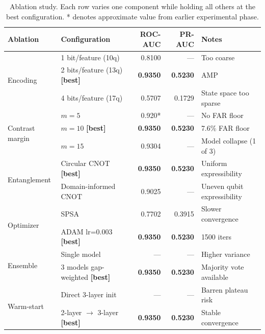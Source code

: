 \begin{table}[htbp]
\centering
\caption{Ablation study. Each row varies one component while holding all others at the best configuration. * denotes approximate value from earlier experimental phase.}
\label{tab:ablation}
\begin{tabular}{llrrp{4cm}}
\toprule
\textbf{Ablation} & \textbf{Configuration} & \textbf{ROC-AUC} & \textbf{PR-AUC} & \textbf{Notes} \\
\midrule
\multirow{3}{*}{Encoding} & 1 bit/feature (10q) & 0.8100 & — & Too coarse \\
 & 2 bits/feature (13q) \textbf{[best]} & \textbf{0.9350} & \textbf{0.5230} & AMP \\
 & 4 bits/feature (17q) & 0.5707 & 0.1729 & State space too sparse \\
\midrule
\multirow{3}{*}{Contrast margin} & $m=5$ & 0.920* & — & No FAR floor \\
 & $m=10$ \textbf{[best]} & \textbf{0.9350} & \textbf{0.5230} & 7.6\% FAR floor \\
 & $m=15$ & 0.9304 & — & Model collapse (1 of 3) \\
\midrule
\multirow{2}{*}{Entanglement} & Circular CNOT \textbf{[best]} & \textbf{0.9350} & \textbf{0.5230} & Uniform expressibility \\
 & Domain-informed CNOT & 0.9025 & — & Uneven qubit expressibility \\
\midrule
\multirow{2}{*}{Optimizer} & SPSA & 0.7702 & 0.3915 & Slower convergence \\
 & ADAM lr=0.003 \textbf{[best]} & \textbf{0.9350} & \textbf{0.5230} & 1500 iters \\
\midrule
\multirow{2}{*}{Ensemble} & Single model & — & — & Higher variance \\
 & 3 models gap-weighted \textbf{[best]} & \textbf{0.9350} & \textbf{0.5230} & Majority vote available \\
\midrule
\multirow{2}{*}{Warm-start} & Direct 3-layer init & — & — & Barren plateau risk \\
 & 2-layer $\to$ 3-layer \textbf{[best]} & \textbf{0.9350} & \textbf{0.5230} & Stable convergence \\
\bottomrule
\end{tabular}
\end{table}